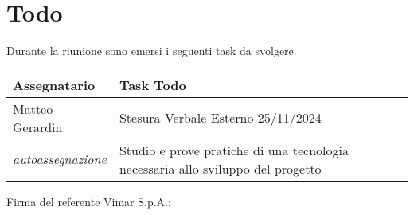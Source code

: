 \section{Todo}
Durante la riunione sono emersi i seguenti task da svolgere.

\begin{center}
  \begin{tabular}{|L{5cm}|L{8cm}|}
    \hline
    \textbf{Assegnatario} & \textbf{Task Todo} \\ \hline
    Matteo Gerardin   &  Stesura Verbale Esterno 25/11/2024\\ \hline
    \textit{autoassegnazione} & Studio e prove pratiche di una tecnologia necessaria allo sviluppo del progetto\\ \hline
  \end{tabular}
\end{center}
\vspace{4cm}
\noindent Firma del referente Vimar S.p.A.: \underline{\hspace{5cm}}